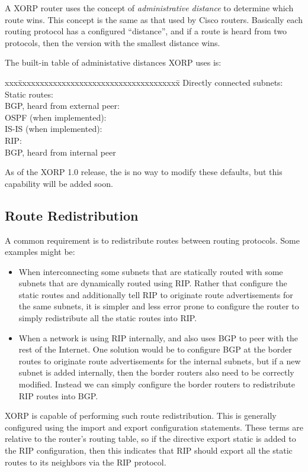 A XORP router uses the concept of {\it administrative distance} to
determine which route wins.  This concept is the same as that used by
Cisco routers.  Basically each routing protocol has a configured
``distance'', and if a route is heard from two protocols, then the
version with the smallest distance wins.

The built-in table of administative distances XORP uses is:
\begin{tabbing}
xxx\=xxxxxxxxxxxxxxxxxxxxxxxxxxxxxxxxxxxxx\=\kill
\>Directly connected subnets: \\
\>Static routes:\\
\>BGP, heard from external peer:\\
\>OSPF (when implemented):\\
\>IS-IS (when implemented):\\
\>RIP:\\
\>BGP, heard from internal peer\\
\end{tabbing}
As of the XORP 1.0 release, the is no way to modify these defaults,
but this capability will be added soon.

\subsection{Route Redistribution}

A common requirement is to redistribute routes between routing
protocols.  Some examples might be:
\begin{itemize}
\item When interconnecting some subnets that are statically routed
  with some subnets that are dynamically routed using RIP.  Rather
  that configure the static routes and additionally tell RIP to
  originate route advertisements for the same subnets, it is simpler
  and less error prone to configure the router to simply redistribute
  all the static routes into RIP.
\item When a network is using RIP internally, and also uses BGP to
  peer with the rest of the Internet.  One solution would be to
  configure BGP at the border routes to originate route advertisements
  for the internal subnets, but if a new subnet is added internally,
  then the border routers also need to be correctly modified.  Instead
  we can simply configure the border routers to redistribute RIP
  routes into BGP.  
\end{itemize}
XORP is capable of performing such route redistribution.  This is
generally configured using the {\stt import} and {\stt export}
configuration statements.  These terms are relative to the router's
routing table, so if the directive {\stt export static} is added to
the RIP configuration, then this indicates that RIP should export all
the static routes to its neighbors via the RIP protocol.

